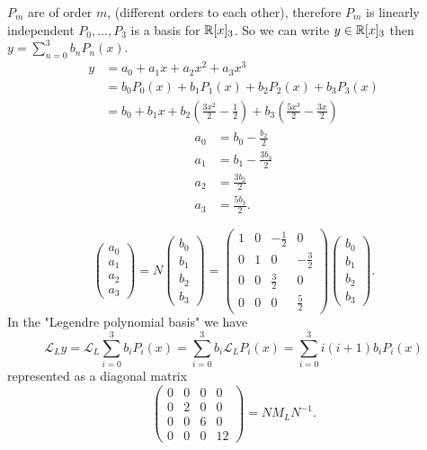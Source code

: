 \documentclass[10pt, a4paper]{article}
\begin{document}
$P_m$ are of order $m$,
(different orders to each other),
therefore $P_m$ is linearly independent $P_0, \dotsc, P_3$ is a basis for $\mathbb{R}[x]_3$.
So we can write $y \in \mathbb{R}[x]_3$ then $y = \sum_{n = 0}^{3}b_nP_n(x)$.
\begin{align*}
    y &= a_0 + a_1x + a_2x ^ 2 + a_3x ^ 3 \\
    &= b_0P_0(x) + b_1P_1(x) + b_2P_2(x) + b_3P_3(x) \\
    &= b_0 + b_1x + b_2\left(\frac{3x ^ 2}{2} - \frac{1}{2}\right) + b_3\left(\frac{5x ^ 3}{2} - \frac{3x}{2}\right)
\end{align*}
\begin{align*}
    a_0 &= b_0 - \frac{b_2}{2} \\
    a_1 &= b_1 - \frac{3b_3}{2} \\
    a_2 &= \frac{3b_2}{2} \\
    a_3 &= \frac{5b_3}{2}.
\end{align*}

\[
\begin{pmatrix}
    a_0 \\ a_1 \\ a_2 \\ a_3
\end{pmatrix} = N\begin{pmatrix}
    b_0 \\ b_1 \\ b_2 \\ b_3
\end{pmatrix} = \begin{pmatrix}
    1 & 0 & -\frac{1}{2} & 0 \\
    0 & 1 & 0 & -\frac{3}{2} \\
    0 & 0 & \frac{3}{2} & 0 \\
    0 & 0 & 0 & \frac{5}{2}
\end{pmatrix}\begin{pmatrix}
    b_0 \\ b_1 \\ b_2 \\ b_3
\end{pmatrix}.
\]
In the "Legendre polynomial basis" we have
\[
\mathcal{L}_Ly = \mathcal{L}_L\sum_{i = 0}^{3}b_iP_i(x) = \sum_{i = 0}^{3}b_i\mathcal{L}_LP_i(x) = \sum_{i = 0}^{3}i(i + 1)b_iP_i(x)
\]
represented as a diagonal matrix
\[
\begin{pmatrix}
    0 & 0 & 0 & 0 \\
    0 & 2 & 0 & 0 \\
    0 & 0 & 6 & 0 \\
    0 & 0 & 0 & 12
\end{pmatrix} = NM_LN ^ {-1}.
\]
\end{document}
